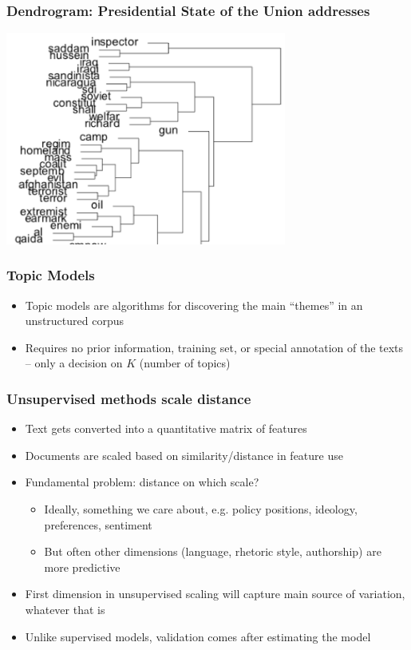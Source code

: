 \documentclass{beamer}
\begin{document}
\begin{frame}
	\frametitle{Dendrogram: Presidential State of the Union addresses}
	\begin{center}
		\includegraphics[height=7cm]{figures/dendrogram2.png}
	\end{center}
\end{frame}


\begin{frame}
	\frametitle{Topic Models}
	\begin{itemize}
		\item Topic models are algorithms for discovering the main
		``themes'' in an unstructured corpus
		\item Requires no prior information, training set, or special
		annotation of the texts \newline -- only a decision on $K$ (number of topics)

	\end{itemize}
\end{frame}








\begin{frame}
	\frametitle{Unsupervised methods scale \alert{distance}}
	\begin{itemize}[<+->]
		\item Text gets converted into a quantitative matrix of
		\alert{features}

		\item Documents are scaled based on similarity/distance in feature use
		\item Fundamental problem: \alert{distance on which scale?}
		\begin{itemize}
			\item Ideally, something we care about, e.g. policy positions, ideology, preferences, sentiment
			\item But often other dimensions (language, rhetoric style, authorship) are more predictive
		\end{itemize}
		\item First dimension in unsupervised scaling will capture main source of variation, whatever that is
		\item Unlike supervised models, validation comes \alert{after} estimating the model
	\end{itemize}
\end{frame}
\end{document}
